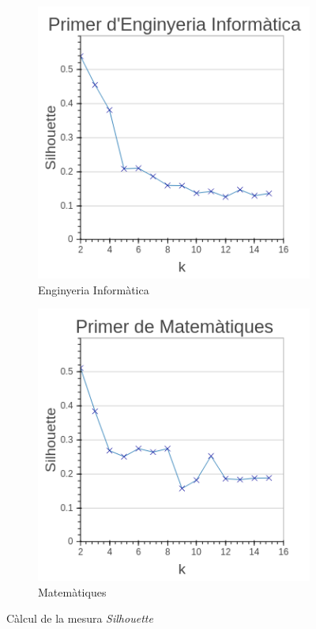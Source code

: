 \documentclass[12pt,a4paper,catalan]{article}
\begin{document}
\begin{figure}[h]
\centering
\begin{subfigure}{.45\textwidth}
  \centering
  \includegraphics[width=\linewidth]{img/silhouette_primer_info.png}
  \caption{Enginyeria Informàtica}
\end{subfigure}
\begin{subfigure}{.45\textwidth}
  \centering
  \includegraphics[width=\linewidth]{img/silhouette_primer_mates.png}
  \caption{Matemàtiques}
\end{subfigure}
\caption{Càlcul de la mesura \textit{Silhouette}}
\label{fig:silhouettekmeans}
\end{figure}
\end{document}
